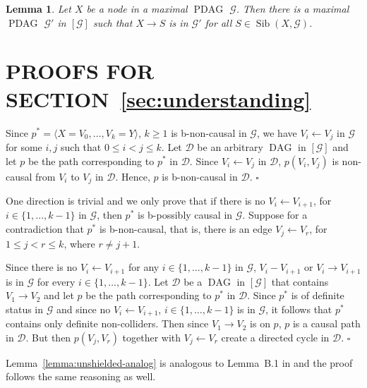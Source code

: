 \documentclass[letterpaper]{article}
\newtheorem{lemma}[theorem]{Lemma}
\theoremstyle{definition}
\newenvironment{proofof}[1][]{\begin{trivlist}
   \item[\hskip \labelsep {\bfseries Proof of #1.}]}{\hfill{}$\square$\end{trivlist}}
\theoremstyle{remark}
\DeclareMathOperator{\PDAG}{PDAG}
\DeclareMathOperator{\DAG}{DAG}
\DeclareMathOperator{\Sib}{Sib}
\newcommand{\mpdag}{maximal $\PDAG$}
\newcommand{\g}[1][G]{\mathcal{#1}}
\newcommand{\pstar}[1][p]{{#1}^{*}}
\begin{document}
\begin{lemma} \citep[cf.\ Lemma~A.8 in][]{ernestroth2016}
Let $X$ be a node in a \mpdag{} $\g$. Then there is a \mpdag{} $\g'$ in $[\g]$ such that $X \rightarrow S$ is in $\g'$ for all $S \in \Sib(X,\g)$. 
\label{lemma:no-new-into}
\end{lemma}

\section{PROOFS FOR SECTION~\ref{sec:understanding}} \label{sec:proofunderstanding}

\begin{proofof}[Lemma~\ref{lemma:posdir-path}]
Since $\pstar = \langle X=V_0, \dots , V_k=Y \rangle$, $k \geq 1$ is b-non-causal in $\g$, we have $V_i \leftarrow V_j$ in $\g$ for some $i,j$ such that $ 0 \le i < j \le k$. Let $\g[D]$ be an arbitrary $\DAG$ in $[\g]$ and let $p$ be the path corresponding to $\pstar$ in $\g[D]$.
Since $V_i \leftarrow V_j$ in $\g[D]$, $p(V_i, V_j)$ is non-causal from $V_i$ to $V_j$ in $\g[D]$.  Hence, $p$ is b-non-causal in $\g[D]$.
\end{proofof}
\begin{proofof}[Lemma~\ref{lemma:def-stat-posdir}]
One direction is trivial and we only prove that if there is no $V_i \leftarrow V_{i+1}$, for $i \in \{1,\dots, k-1\}$  in $\g$, then $\pstar$ is b-possibly causal in $\g$. Suppose for a contradiction that $\pstar$ is b-non-causal, that is, there is an edge $V_{j} \leftarrow V_{r}$, for $1 \le j < r \le k$, where $r \neq j +1$. 

Since there is no $V_i \leftarrow V_{i+1}$ for any $i \in \{1,\dots, k-1\}$ in $\g$, $V_i - V_{i+1}$ or $V_i \rightarrow V_{i+1}$ is in $\g$ for every $i \in \{1,\dots, k-1\}$.
Let $\g[D]$ be a $\DAG$ in $[\g]$ that contains $V_1 \rightarrow V_2$ and let $p$ be the path corresponding to $\pstar$ in $\g[D]$. 
Since $\pstar$ is of definite status in $\g$ and since no $V_i \leftarrow V_{i+1}$, $i \in \{1,\dots, k-1\}$ is in $\g$, it follows that $\pstar$ contains only definite non-colliders. Then since $V_1 \rightarrow V_2$ is on $p$, $p$ is a causal path in $\g[D]$.
But then $p(V_{j},V_{r})$ together with $V_j \leftarrow V_r$ create a directed cycle in $\g[D]$. 
\end{proofof}
Lemma~\ref{lemma:unshielded-analog} is analogous to Lemma~B.1 in \cite{zhang2008completeness} and the proof follows the same reasoning as well.
\end{document}
